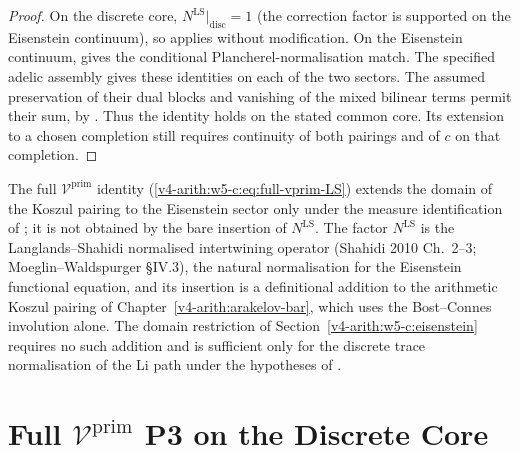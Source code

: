 \begin{proof}
On the discrete core, \(N^{\mathrm{LS}}|_{\mathrm{disc}}=1\)
(the correction factor is supported on the Eisenstein continuum),
so  applies without
modification. On the Eisenstein continuum,
 gives the conditional
Plancherel-normalisation match.
The specified adelic assembly gives these identities on each of
the two sectors. The assumed preservation of their dual blocks
and vanishing of the mixed bilinear terms permit their sum,
by . Thus the
identity holds on the stated common core. Its extension to a
chosen completion still requires continuity of both pairings
and of $c$ on that completion.
\end{proof}

\begin{remark}
\label{v4-arith:w5-c:rem:LS-cost}
The full \(\mathcal{V}^{\mathrm{prim}}\) identity
(\ref{v4-arith:w5-c:eq:full-vprim-LS}) extends the domain of the
Koszul pairing to the Eisenstein sector only under the measure
identification of ; it is not obtained
by the bare insertion of
\(N^{\mathrm{LS}}\). The factor \(N^{\mathrm{LS}}\) is the
Langlands--Shahidi normalised intertwining operator
(Shahidi 2010 Ch.~2--3; Moeglin--Waldspurger \S IV.3), the natural
normalisation for the Eisenstein functional equation, and its insertion
is a definitional addition to the arithmetic Koszul pairing of
Chapter~\ref{v4-arith:arakelov-bar}, which uses the Bost--Connes
involution alone. The domain restriction of
Section~\ref{v4-arith:w5-c:eisenstein} requires no such addition and
is sufficient only for the discrete trace normalisation of the Li path
under the hypotheses of
.
\end{remark}

\section{Full \(\mathcal{V}^{\mathrm{prim}}\) P3 on the Discrete Core}
\label{v4-arith:w5-c:P3-statement}

